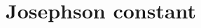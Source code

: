 \hypertarget{group___conventional_josephson_constant}{}\section{Josephson constant}
\label{group___conventional_josephson_constant}
